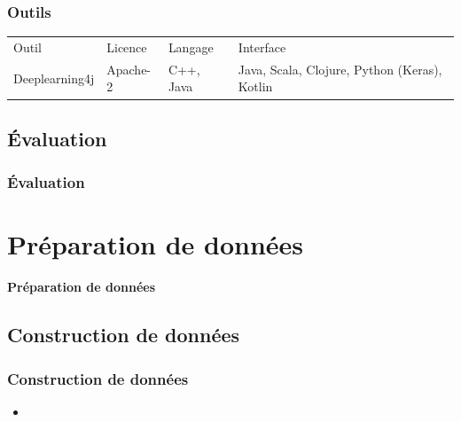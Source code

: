 \documentclass[]{beamer} %
\begin{document}
\begin{frame}
\frametitle{Outils}

\begin{tabular}{llll}
	Outil & Licence & Langage & Interface \\
	Deeplearning4j & Apache-2 & C++, Java & Java, Scala, Clojure, Python (Keras), Kotlin \\
\end{tabular}

\end{frame}


\subsection{Évaluation}

\begin{frame}
\frametitle{Évaluation}

\end{frame}

\section{Préparation de données}

\begin{frame}

\begin{center}
	\Huge\bfseries Préparation de données
\end{center}

\end{frame}

\subsection{Construction de données}

\begin{frame}
\frametitle{Construction de données}

\begin{itemize}
\item 
\end{itemize}

\end{frame}
\end{document}
